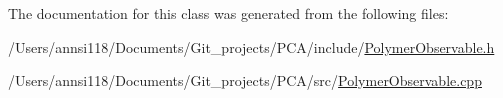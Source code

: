 The documentation for this class was generated from the following files\+:\begin{DoxyCompactItemize}
\item 
/\+Users/annsi118/\+Documents/\+Git\+\_\+projects/\+P\+C\+A/include/\hyperlink{_polymer_observable_8h}{Polymer\+Observable.\+h}\item 
/\+Users/annsi118/\+Documents/\+Git\+\_\+projects/\+P\+C\+A/src/\hyperlink{_polymer_observable_8cpp}{Polymer\+Observable.\+cpp}\end{DoxyCompactItemize}
